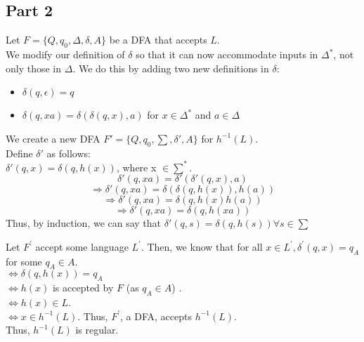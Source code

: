 \documentclass[12pt,a4paper]{article}
\begin{document}
\subsection{Part 2}
Let $F = \{Q,q_0,\Delta,\delta,A\}$ be a DFA that accepts $L$.
\\We modify our definition of $\delta$ so that it can now accommodate inputs in $\Delta^*$, not only those in $\Delta$. We do this by adding two new definitions in $\delta$:
\begin{itemize}
\item $\delta(q,\epsilon) = q$
\item $\delta(q,xa) = \delta(\delta(q,x),a)$ for $x \in \Delta^*$ and $a \in \Delta$
\end{itemize}
We create a new DFA $F' =\{Q,q_0,\sum,\delta',A\}$ for $h^{-1}(L)$.
\\Define $\delta'$ as follows:
\\$\delta'(q,x) = \delta(q,h(x))$, where x $ \in\sum^*$.
$$\delta'(q,xa) = \delta'(\delta'(q,x),a)$$
$$\Rightarrow \delta'(q,xa) = \delta(\delta(q,h(x)),h(a))$$
$$\Rightarrow \delta'(q,xa) = \delta(q,h(x)h(a))$$
$$\Rightarrow \delta'(q,xa) = \delta(q,h(xa))$$
Thus, by induction, we can say that $\delta'(q,s) = \delta(q,h(s)) \forall s \in \sum$

Let $F^'$ accept some language $L^'$. Then, we know that for all $x \in L^{'} , \delta^{'}(q,x) = q_A$ for some $q_A \in A$.
\\$\iff \delta(q,h(x)) = q_A $
\\$\iff h(x)$ is accepted by $F$ (as $q_A \in A$) .
\\$\iff h(x) \in L$.
\\$\iff x \in h^{-1}(L)$.
Thus, $F^'$, a DFA, accepts $h^{-1}(L)$.
\\Thus, $h^{-1}(L)$ is regular.

    
 
\end{document}
